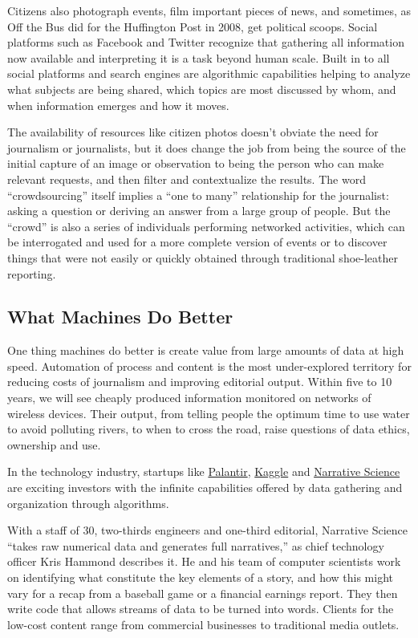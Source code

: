 Citizens also photograph events, film important pieces of news, and sometimes,
as Off the Bus did for the Huffington Post in 2008, get political scoops. Social
platforms such as Facebook and Twitter recognize that gathering all information
now available and interpreting it is a task beyond human scale. Built in to all
social platforms and search engines are algorithmic capabilities helping to analyze
what subjects are being shared, which topics are most discussed by whom, and
when information emerges and how it moves.

The availability of resources like citizen photos doesn’t obviate the need for
journalism or journalists, but it does change the job from being the source of the
initial capture of an image or observation to being the person who can make
relevant requests, and then filter and contextualize the results. The word ``crowdsourcing''
itself implies a ``one to many'' relationship for the journalist: asking a
question or deriving an answer from a large group of people. But the ``crowd'' is also a series of individuals performing networked activities, which can be interrogated
and used for a more complete version of events or to discover things that
were not easily or quickly obtained through traditional shoe-leather reporting.

\subsection{What Machines Do Better}

One thing machines do better is create value from large amounts of data at high
speed. Automation of process and content is the most under-explored territory
for reducing costs of journalism and improving editorial output. Within five to
10 years, we will see cheaply produced information monitored on networks
of wireless devices. Their output, from telling people the optimum time to use
water to avoid polluting rivers, to when to cross the road, raise questions of data
ethics, ownership and use.

In the technology industry, startups like \href{http://www.palantir.com/}{Palantir}, \href{http://www.kaggle.com/}{Kaggle} and \href{http://www.narrativescience.com/}{Narrative Science}
are exciting investors with the infinite capabilities offered by data gathering and
organization through algorithms.

With a staff of 30, two-thirds engineers and one-third editorial, Narrative
Science ``takes raw numerical data and generates full narratives,'' as chief
technology officer Kris Hammond describes it. He and his team of computer
scientists work on identifying what constitute the key elements of a story, and
how this might vary for a recap from a baseball game or a financial earnings
report. They then write code that allows streams of data to be turned into
words. Clients for the low-cost content range from commercial businesses to
traditional media outlets.

